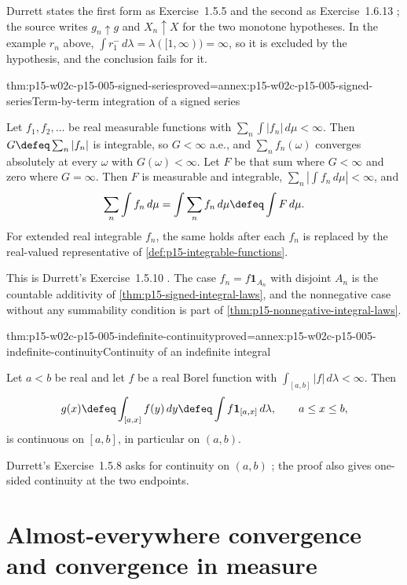 Durrett states the first form as Exercise~1.5.5 and the second as
Exercise~1.6.13 \cite[pp.~28, 37]{DurrettPTEAuthor2019}; the source
writes \(g_n\uparrow g\) and \(X_n\uparrow X\) for the two monotone
hypotheses. In the example \(r_n\) above,
\(\int r_1^-\,d\lambda=\lambda([1,\infty))=\infty\), so it is
excluded by the hypothesis, and the conclusion fails for it.

\begin{hbtheorem}{thm:p15-w02c-p15-005-signed-series}{proved=annex:p15-w02c-p15-005-signed-series}{Term-by-term integration of a signed series}
\par\nobreak
Let \(f_1,f_2,\ldots\) be real measurable functions with
\(\sum_n\int|f_n|\,d\mu<\infty\). Then
\(G\defeq\sum_n|f_n|\) is integrable, so \(G<\infty\) a.e., and
\(\sum_nf_n(\omega)\) converges absolutely at every \(\omega\) with
\(G(\omega)<\infty\). Let \(F\) be that sum where \(G<\infty\) and
zero where \(G=\infty\). Then \(F\) is measurable and integrable,
\(\sum_n\left|\int f_n\,d\mu\right|<\infty\), and
\[
 \sum_n\int f_n\,d\mu=\int\sum_nf_n\,d\mu\defeq\int F\,d\mu .
\]
For extended real integrable \(f_n\), the same holds after each
\(f_n\) is replaced by the real-valued representative of
\cref{def:p15-integrable-functions}.
\end{hbtheorem}

This is Durrett's Exercise~1.5.10 \cite[p.~28]{DurrettPTEAuthor2019}.
The case \(f_n=f\mathbf1_{A_n}\) with disjoint \(A_n\) is the countable
additivity of \cref{thm:p15-signed-integral-laws}, and the nonnegative
case without any summability condition is part of
\cref{thm:p15-nonnegative-integral-laws}.

\begin{hbtheorem}{thm:p15-w02c-p15-005-indefinite-continuity}{proved=annex:p15-w02c-p15-005-indefinite-continuity}{Continuity of an indefinite integral}
\par\nobreak
Let \(a<b\) be real and let \(f\) be a real Borel function with
\(\int_{[a,b]}|f|\,d\lambda<\infty\). Then
\[
 g(x)\defeq\int_{[a,x]}f(y)\,dy\defeq\int f\mathbf1_{[a,x]}\,d\lambda,
 \qquad a\leq x\leq b,
\]
is continuous on \([a,b]\), in particular on \((a,b)\).
\end{hbtheorem}

Durrett's Exercise~1.5.8 asks for continuity on \((a,b)\)
\cite[p.~28]{DurrettPTEAuthor2019}; the proof also gives one-sided
continuity at the two endpoints.

\section{Almost-everywhere convergence and convergence in measure}
\label{sec:p15-w02c-p15-005-modes}


